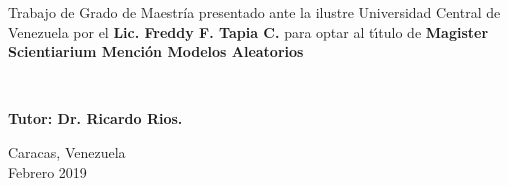 \vspace{2cm}

\hspace{6cm}
\begin{minipage}[t]{9cm}
Trabajo de Grado de Maestr\'ia presentado ante la ilustre Universidad Central de Venezuela por el
\textbf{Lic. Freddy F. Tapia C.} para optar al t\'{\i}tulo de \textbf{Magister Scientiarium Menci\'on Modelos Aleatorios}

\

\textbf{Tutor: Dr. Ricardo Rios.}
\end{minipage}



\vspace{1.5cm}

\begin{center}
Caracas, Venezuela \\
Febrero 2019
\end{center}

\newpage
